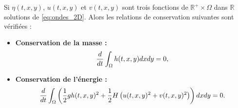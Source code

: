 \begin{proposition}
Si $\eta(t,x,y)$, $u(t,x,y)$ et $v(t,x,y)$ sont trois fonctions de $\mathbb{R}^+ \times \Omega$ dans $\mathbb{R}$ solutions de \eqref{eq:ondes_2D}. Alors les relations de conservation suivantes sont vérifiées :
\begin{itemize}
\item \textbf{Conservation de la masse :}
\begin{equation}
\dfrac{d}{dt} \displaystyle\int_{\Omega} h(t,x,y)dxdy = 0,
\end{equation}
\item \textbf{Conservation de l'énergie :}
\begin{equation}
\dfrac{d}{dt} \displaystyle\int_{\Omega} \left( \dfrac{1}{2} g h(t,x,y)^2 + \dfrac{1}{2} H \left( u(t,x,y)^2 + v(t,x,y)^2 \right) \right) dxdy = 0.
\end{equation}
\end{itemize}
\end{proposition}

